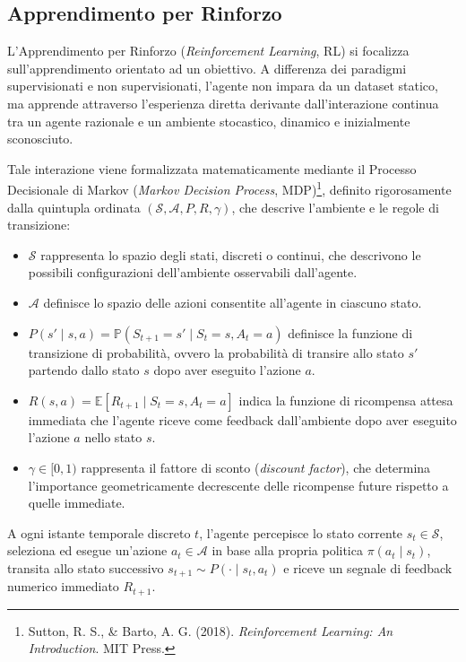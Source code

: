 \subsection{Apprendimento per Rinforzo}
L'Apprendimento per Rinforzo (\textit{Reinforcement Learning}, RL) si focalizza sull'apprendimento orientato ad un obiettivo. A differenza dei paradigmi supervisionati e non supervisionati, l'agente non impara da un dataset statico, ma apprende attraverso l'esperienza diretta derivante dall'interazione continua tra un agente razionale e un ambiente stocastico, dinamico e inizialmente sconosciuto.

Tale interazione viene formalizzata matematicamente mediante il Processo Decisionale di Markov (\textit{Markov Decision Process}, MDP)\footnote{Sutton, R. S., \& Barto, A. G. (2018). \textit{Reinforcement Learning: An Introduction}. MIT Press.}, definito rigorosamente dalla quintupla ordinata $(\mathcal{S}, \mathcal{A}, P, R, \gamma)$, che descrive l'ambiente e le regole di transizione:
\begin{itemize}
    \item $\mathcal{S}$ rappresenta lo spazio degli stati, discreti o continui, che descrivono le possibili configurazioni dell'ambiente osservabili dall'agente.
    \item $\mathcal{A}$ definisce lo spazio delle azioni consentite all'agente in ciascuno stato.
    \item $P(s' \mid s, a) = \mathbb{P}(S_{t+1} = s' \mid S_t = s, A_t = a)$ definisce la funzione di transizione di probabilità, ovvero la probabilità di transire allo stato $s'$ partendo dallo stato $s$ dopo aver eseguito l'azione $a$.
    \item $R(s, a) = \mathbb{E}[R_{t+1} \mid S_t = s, A_t = a]$ indica la funzione di ricompensa attesa immediata che l'agente riceve come feedback dall'ambiente dopo aver eseguito l'azione $a$ nello stato $s$.
    \item $\gamma \in [0, 1)$ rappresenta il fattore di sconto (\textit{discount factor}), che determina l'importance geometricamente decrescente delle ricompense future rispetto a quelle immediate.
\end{itemize}

A ogni istante temporale discreto $t$, l'agente percepisce lo stato corrente $s_t \in \mathcal{S}$, seleziona ed esegue un'azione $a_t \in \mathcal{A}$ in base alla propria politica $\pi(a_t \mid s_t)$, transita allo stato successivo $s_{t+1} \sim P(\cdot \mid s_t, a_t)$ e riceve un segnale di feedback numerico immediato $R_{t+1}$.

